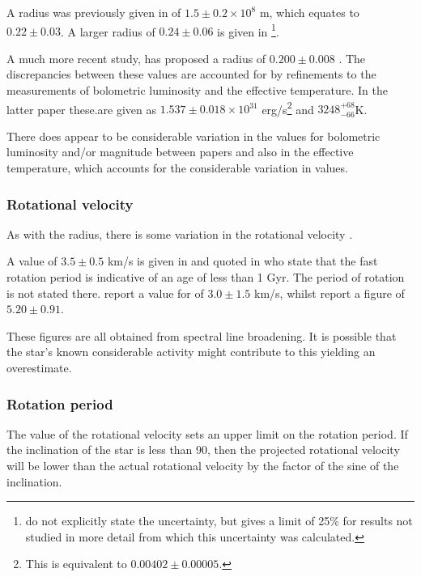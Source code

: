 A radius was previously given in \citet{pettersen80} of $1.5 \pm 0.2 \times 10^8$ m, which equates to $0.22 \pm
0.03$\rsun. A larger radius of $0.24 \pm 0.06$ {\rsun} is given in \citet{johnson83}
\footnote{\citet{johnson83} do not explicitly state the
uncertainty, but gives a limit of 25\% for results not studied in more detail
from which this uncertainty was calculated.}.

A much more recent study, \citet{pineda21} has proposed a radius of $0.200 \pm
0.008$ \rsun. The discrepancies between these values are accounted for by
refinements to the measurements of bolometric luminosity and the effective
temperature. In the latter paper these.are given as $1.537 \pm 0.018
\times 10^31$ erg/s\footnote{This is equivalent to $0.00402 \pm 0.00005$\lsun.}
and $3248^{+68}_{-66}$K.

There does appear to be considerable variation in the values for bolometric
luminosity and/or magnitude between papers and also in the effective
temperature, which accounts for the considerable variation in values.

\subsubsection{Rotational velocity \vsini}

As with the radius, there is some variation in the rotational velocity \vsini.

A value of $3.5 \pm 0.5$ km/s is given in \citet{johnskrull96} and quoted in
\citet{wargelin08} who state that the fast rotation period is indicative of an
age of less than 1 Gyr. The period of rotation is not stated there.
\citet{reiners18} report a value for {\vsini} of $3.0 \pm 1.5$ km/s, whilst
\citet{hojjatpanah19} report a figure of $5.20 \pm 0.91$.

These figures are all obtained from spectral line broadening. It is possible
that the star's known considerable activity might contribute to this yielding an
overestimate.

\subsubsection{Rotation period}

The value of the rotational velocity sets an upper limit on the rotation period.
If the inclination of the star is less than 90{\degree}, then the projected
rotational velocity {\vsini} will be lower than the actual rotational velocity
by the factor of the sine of the inclination.

